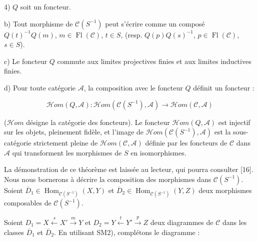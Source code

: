 \par\noindent\hspace*{2em}4) $Q$ soit un foncteur.

\par\noindent b) Tout morphisme de $\mathcal C(S^{-1})$ peut s'écrire comme
un composé $Q(t)^{-1}Q(m)$, $m\in\operatorname{Fl}(\mathcal C)$, $t\in S$,
(resp. $Q(p)Q(s)^{-1}$, $p\in\operatorname{Fl}(\mathcal C)$, $s\in S$).

\par\noindent c) Le foncteur $Q$ commute aux limites projectives finies et
aux limites inductives finies.

\par\noindent d) Pour toute catégorie $\mathcal A$, la composition avec le
foncteur $Q$ définit un foncteur :

\[
  \mathcal{H}\!om(Q,\mathcal A)\colon
  \mathcal{H}\!om(\mathcal C(S^{-1}),\mathcal A)
  \longrightarrow \mathcal{H}\!om(\mathcal C,\mathcal A)
\]

\noindent\textup{($\mathcal{H}\!om$ désigne la catégorie des foncteurs).}
%
Le foncteur $\mathcal{H}\!om(Q,\mathcal A)$ est injectif sur les objets,
pleinement fidèle, et l'image de
$\mathcal{H}\!om(\mathcal C(S^{-1}),\mathcal A)$ est la sous-catégorie
strictement pleine de $\mathcal{H}\!om(\mathcal C,\mathcal A)$ définie par les
foncteurs de $\mathcal C$ dans $\mathcal A$ qui transforment les morphismes
de $S$ en isomorphismes.
\par\endgroup

La démonstration de ce théorème est laissée au lecteur, qui pourra consulter
[16].
%
Nous nous bornerons à décrire la composition des morphismes dans
$\mathcal C(S^{-1})$. Soient
$\overline D_1\in\operatorname{Hom}_{\mathcal C(S^{-1})}(X,Y)$ et
$\overline D_2\in\operatorname{Hom}_{\mathcal C(S^{-1})}(Y,Z)$ deux
morphismes composables de $\mathcal C(S^{-1})$.

Soient $D_1=X\xleftarrow{s}X'\xrightarrow{m}Y$ et
$D_2=Y\xleftarrow{t}Y'\xrightarrow{p}Z$ deux diagrammes de $\mathcal C$
dans les classes $\overline D_1$ et $\overline D_2$.
%
En utilisant SM2), complétons le diagramme :

\begin{center}
\end{center}

\endgroup
